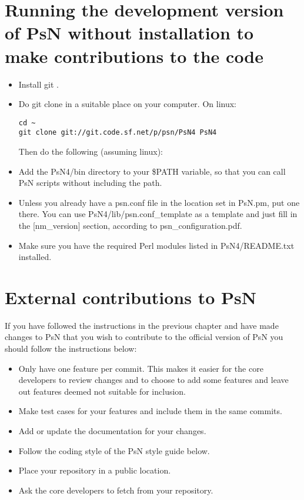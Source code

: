 \section{Running the development version of PsN without installation to make contributions to the code}
\begin{itemize}
\item Install git \cite{git}. 
\item Do git clone in a suitable place on your computer. On linux:
\begin{verbatim}
cd ~
git clone git://git.code.sf.net/p/psn/PsN4 PsN4

\end{verbatim}
\noindent Then do the following (assuming linux):
\item Add the PsN4/bin directory to your \$PATH variable, so that you can call PsN scripts without including the path.
\item Unless you already have a psn.conf file in the location set in PsN.pm, put one there. 
You can use PsN4/lib/psn.conf\_template as a template and just fill in the [nm\_version] section,
according to psn\_configuration.pdf.
\item Make sure you have the required Perl modules listed in PsN4/README.txt installed.
\end{itemize}

\section{External contributions to PsN}
If you have followed the instructions in the previous chapter and have made changes to PsN that you wish to contribute
to the official version of PsN you should follow the instructions below:

\begin{itemize}
    \item Only have one feature per commit. This makes it easier for the core developers to review changes and to choose to add some features and leave out features deemed not suitable for inclusion.
    \item Make test cases for your features and include them in the same commits.
    \item Add or update the documentation for your changes.
    \item Follow the coding style of the PsN style guide below.
    \item Place your repository in a public location.
    \item Ask the core developers to fetch from your repository.
\end{itemize}

